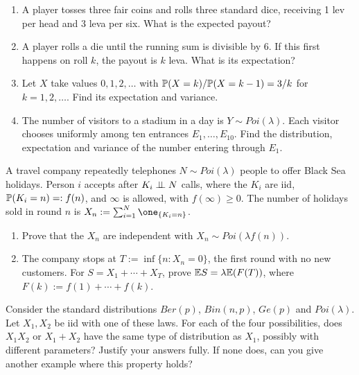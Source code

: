 \documentclass[a4paper]{report}
\begin{document}
\begin{problempencil}
\begin{enumerate}
\item A player tosses three fair coins and rolls three standard dice, receiving 1 lev per head and 3 leva per six. What is the expected payout?
\item A player rolls a die until the running sum is divisible by 6. If this first happens on roll $k$, the payout is $k$ leva. What is its expectation?
\item Let $X$ take values $0,1,2,\dots$ with $\P(X=k)/\P(X=k-1)=3/k$ for $k=1,2,\dots$. Find its expectation and variance.
\item The number of visitors to a stadium in a day is $Y\sim Poi(\lambda)$. Each visitor chooses uniformly among ten entrances $E_1,\dots,E_{10}$. Find the distribution, expectation and variance of the number entering through $E_1$.
\end{enumerate}
\end{problempencil}
\begin{problempencil}
A travel company repeatedly telephones $N\sim Poi(\lambda)$ people to offer Black Sea holidays. Person $i$ accepts after $K_i\indep N$ calls, where the $K_i$ are iid, $\P(K_i=n)=:f(n)$, and $\infty$ is allowed, with $f(\infty)\ge0$. The number of holidays sold in round $n$ is $X_n:=\sum_{i=1}^N\one_{\{K_i=n\}}$.
\begin{enumerate}
\item Prove that the $X_n$ are independent with $X_n\sim Poi(\lambda f(n))$.
\item The company stops at $T:=\inf\{n:X_n=0\}$, the first round with no new customers. For $S=X_1+\cdots+X_T$, prove $\E S=\lambda\E(F(T))$, where $F(k):=f(1)+\cdots+f(k)$.
\end{enumerate}
\end{problempencil}
\begin{problempencil}
Consider the standard distributions $Ber(p)$, $Bin(n,p)$, $Ge(p)$ and $Poi(\lambda)$. Let $X_1,X_2$ be iid with one of these laws. For each of the four possibilities, does $X_1X_2$ or $X_1+X_2$ have the same type of distribution as $X_1$, possibly with different parameters? Justify your answers fully. If none does, can you give another example where this property holds?
\end{problempencil}
\end{document}
